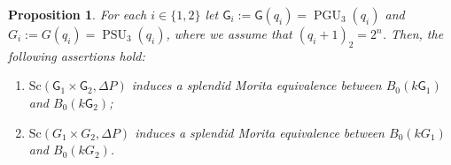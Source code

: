 \documentclass[12pt,a4paper]{amsart}
\theoremstyle{plain}\newtheorem{Theorem}{Theorem}[section]
\theoremstyle{plain}\newtheorem{Conjecture}[Theorem]{Conjecture}
\theoremstyle{plain}\newtheorem{Corollary}[Theorem]{Corollary}
\theoremstyle{plain}\newtheorem{Lemma}[Theorem]{Lemma}
\theoremstyle{plain}\newtheorem{Proposition}[Theorem]{Proposition}
\theoremstyle{definition}\newtheorem{Definition}[Theorem]{Definition}
\theoremstyle{definition}\newtheorem{Example}[Theorem]{Example}
\theoremstyle{definition}\newtheorem{Examples}[Theorem]{Examples}
\theoremstyle{definition}\newtheorem{Remark}[Theorem]{Remark}
\theoremstyle{definition}\newtheorem{Question}[Theorem]{Question}
\theoremstyle{definition}\newtheorem{Notation}[Theorem]{Notation}
\theoremstyle{definition}\newtheorem{Hypothesis}[Theorem]{Hypothesis}
\theoremstyle{definition}\newtheorem{Assumption}[Theorem]{Assumption}
\theoremstyle{definition}\newtheorem{Strategy}[Theorem]{Strategy}
\theoremstyle{definition}\newtheorem{Contents}[Theorem]{Contents}
\theoremstyle{definition}\newtheorem{Computations}[Theorem]{Computations}
\theoremstyle{definition}\newtheorem{Equivalences}[Theorem]{Equivalences}
\theoremstyle{definition}\newtheorem{Notation/Definition}[Theorem]{Notation/Definition}
\theoremstyle{definition}\newtheorem{noth}[Theorem]{}
\theoremstyle{plain}\newtheorem{Step}[Theorem]{Step}
\newcommand{\PSU}{\operatorname{PSU}}
\newcommand{\PGU}{\operatorname{PGU}}
\begin{document}
\begin{Proposition}\label{lem:FinalStroke}\label{prop:PSU3}%
For each $i\in\{1,2\}$ let  $\mathsf{G}_{i}:=\mathsf{G}(q_{i})=\PGU_{3}(q_{i})$ and 
$G_{i}:=G(q_{i})=\PSU_3(q_i)$, where we assume that $(q_{i}+1)_2=2^n$. 
Then,  the following assertions hold:
\begin{enumerate}
\item[\rm(a)] $\mathrm{Sc}(\mathsf{G}_1\times \mathsf{G}_2,\Delta P)$ induces a splendid 
Morita equivalence between $B_0(k\mathsf{G}_1)$ and $B_0(k\mathsf{G}_2)$;
\item[\rm(b)]  $\mathrm{Sc}(G_1\times G_2,\Delta P)$ induces a splendid Morita
equivalence between $B_0(kG_1)$ and $B_0(kG_2)$. 
\end{enumerate}
\end{Proposition}
\end{document}
